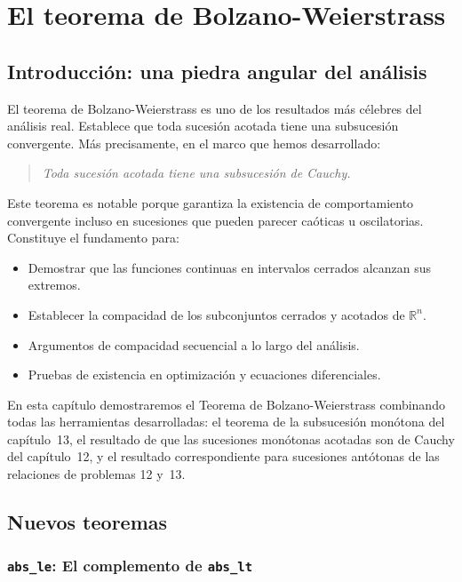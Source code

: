 \chapter{El teorema de Bolzano-Weierstrass}

\section{Introducción: una piedra angular del análisis}

El teorema de Bolzano-Weierstrass es uno de los resultados más célebres
del análisis real. Establece que toda sucesión acotada tiene una
subsucesión convergente. Más precisamente, en el marco que hemos
desarrollado:

\begin{quote}
  \itshape
  Toda sucesión acotada tiene una subsucesión de Cauchy.
\end{quote}

Este teorema es notable porque garantiza la existencia de comportamiento
convergente incluso en sucesiones que pueden parecer caóticas u
oscilatorias. Constituye el fundamento para:

\begin{itemize}
  \item Demostrar que las funciones continuas en intervalos cerrados
        alcanzan sus extremos.
  \item Establecer la compacidad de los subconjuntos cerrados y acotados
        de $\mathbb{R}^n$.
  \item Argumentos de compacidad secuencial a lo largo del análisis.
  \item Pruebas de existencia en optimización y ecuaciones diferenciales.
\end{itemize}

En esta capítulo demostraremos el Teorema de Bolzano-Weierstrass
combinando todas las herramientas desarrolladas: el teorema de la
subsucesión monótona del capítulo~13, el resultado de que las
sucesiones monótonas acotadas son de Cauchy del capítulo~12, y el
resultado correspondiente para sucesiones antótonas de las relaciones de
problemas 12 y~13.

\section{Nuevos teoremas}

\subsection{\texttt{abs\_le}: El complemento de \texttt{abs\_lt}}

